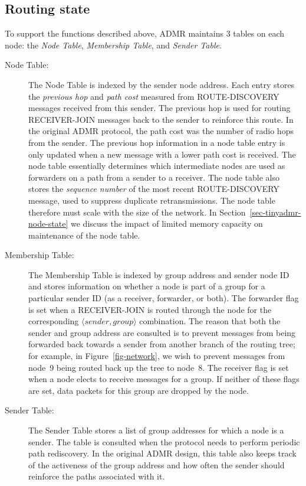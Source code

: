 \subsection{Routing state}
\label{sec-tinyadmr-route-state}
To support the functions described above, ADMR maintains 3 tables 
on each node: the {\em Node Table}, {\em Membership Table}, 
and {\em Sender Table}. 


\begin{description}
\item[Node Table:]
The Node Table is indexed by the sender node address. Each
entry stores the {\em previous hop} and {\em path cost} measured
from ROUTE-DISCOVERY messages received from this sender.
The previous hop is used for routing RECEIVER-JOIN messages
back to the sender to reinforce this route. In the original
ADMR protocol, the path cost was the number of radio hops from
the sender. The previous hop information in a node table entry 
is only updated when a new
message with a lower path cost is received.
The node table essentially determines which intermediate nodes
are used as forwarders on a path from a sender to a receiver.
The node table also stores the {\em sequence number} of the most
recent ROUTE-DISCOVERY message, used to suppress duplicate
retransmissions. The node table therefore must scale with the
size of the network. In Section~\ref{sec-tinyadmr-node-state} we discuss 
the impact of limited memory capacity on maintenance of the
node table.


\item[Membership Table:]
The Membership Table is indexed by group address and sender node
ID and stores information on whether a node is part of a group for
a particular sender ID (as a receiver, forwarder, or both). 
The forwarder flag is set when 
a RECEIVER-JOIN is routed through the node for the corresponding
$\langle \mathit{sender}, \mathit{group} \rangle$ combination.
The reason that both the sender and group address are 
consulted is to prevent messages from being forwarded
back towards a sender from another branch of the routing
tree; for example, in Figure~\ref{fig-network}, we wish to
prevent messages from node~9 being routed back up the tree to
node~8. The receiver flag is set when a node elects to receive
messages for a group. If neither of these flags are set, 
data packets for this group are dropped by the node.

\item[Sender Table:]
The Sender Table stores a list of group addresses for which a node 
is a sender. The table is consulted when the protocol needs to 
perform periodic path rediscovery. In the original ADMR design,
this table also keeps track of the activeness of the group address
and how often the sender should reinforce the paths associated with it.

\end{description}



